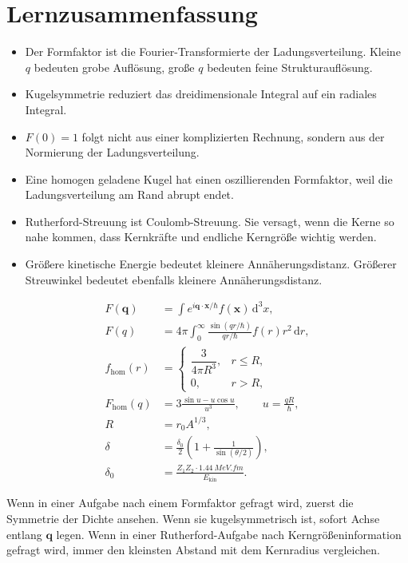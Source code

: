 \documentclass[11pt,a4paper]{scrartcl}
\newcommand{\paren}[1]{\left( #1 \right)}
\newcommand{\dd}{\,\mathrm{d}}
\newcommand{\vect}[1]{\bm{#1}}
\begin{document}
\section{Lernzusammenfassung}

\begin{summarybox}[title=Was man wirklich verstehen sollte]
\begin{itemize}
    \item Der Formfaktor ist die Fourier-Transformierte der Ladungsverteilung. Kleine $q$ bedeuten grobe Aufl\"osung, gro\ss{}e $q$ bedeuten feine Strukturaufl\"osung.
    \item Kugelsymmetrie reduziert das dreidimensionale Integral auf ein radiales Integral.
    \item $F(0)=1$ folgt nicht aus einer komplizierten Rechnung, sondern aus der Normierung der Ladungsverteilung.
    \item Eine homogen geladene Kugel hat einen oszillierenden Formfaktor, weil die Ladungsverteilung am Rand abrupt endet.
    \item Rutherford-Streuung ist Coulomb-Streuung. Sie versagt, wenn die Kerne so nahe kommen, dass Kernkr\"afte und endliche Kerngr\"o\ss{}e wichtig werden.
    \item Gr\"o\ss{}ere kinetische Energie bedeutet kleinere Ann\"aherungsdistanz. Gr\"o\ss{}erer Streuwinkel bedeutet ebenfalls kleinere Ann\"aherungsdistanz.
\end{itemize}
\end{summarybox}

\begin{formulabox}[title={Formeln, die man f\"ur dieses Blatt k\"onnen sollte}]
\begin{align*}
    F(\vect{q})&=\int e^{i\vect{q}\cdot\vect{x}/\hbar}f(\vect{x})\dd^3x,\\
    F(q)&=4\pi\int_0^\infty\frac{\sin(qr/\hbar)}{qr/\hbar}f(r)r^2\dd r,\\
    f_{\mathrm{hom}}(r)&=\begin{cases}
        \dfrac{3}{4\pi R^3}, & r\le R,\\
        0, & r>R,
    \end{cases}\\
    F_{\mathrm{hom}}(q)&=3\frac{\sin u-u\cos u}{u^3},\qquad u=\frac{qR}{\hbar},\\
    R&=r_0A^{1/3},\\
    \delta&=\frac{\delta_0}{2}\paren{1+\frac{1}{\sin(\theta/2)}},\\
    \delta_0&=\frac{Z_1Z_2\cdot\SI{1.44}{MeV.fm}}{E_{\mathrm{kin}}}.
\end{align*}
\end{formulabox}

\begin{notebox}[title=Pr\"ufungsintuition]
Wenn in einer Aufgabe nach einem Formfaktor gefragt wird, zuerst die Symmetrie der Dichte ansehen. Wenn sie kugelsymmetrisch ist, sofort Achse entlang $\vect{q}$ legen. Wenn in einer Rutherford-Aufgabe nach Kerngr\"o\ss{}eninformation gefragt wird, immer den kleinsten Abstand mit dem Kernradius vergleichen.
\end{notebox}
\end{document}
